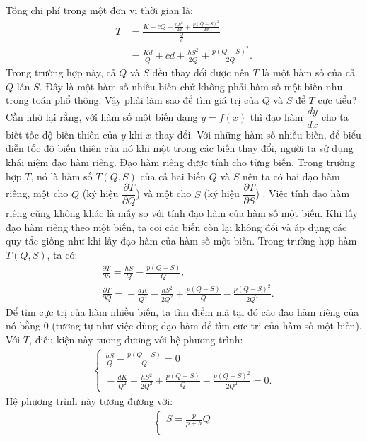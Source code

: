 \begin{multicols}{2}
	Tổng chi phí trong một đơn vị thời gian là:
	\begin{align*}
		T &= \frac{K + cQ + \frac{hS^2}{2d} + \frac{p(Q-S)^2}{2d}}{\frac{Q}{d}}\\
		 &= \frac{Kd}{Q} + cd + \frac{hS^2}{2Q} + \frac{p(Q-S)^2}{2Q}.
	\end{align*}
	Trong trường hợp này, cả $Q$ và $S$ đều thay đổi được nên $T$ là một hàm số của cả $Q$ lẫn $S$. Đây là một hàm số nhiều biến chứ không phải hàm số một biến như trong toán phổ thông. Vậy phải làm sao để tìm giá trị của $Q$ và $S$ để $T$ cực tiểu?
	\vskip 0.1cm
	Cần nhớ lại rằng, với hàm số một biến dạng $y=f(x)$ thì đạo hàm $\dfrac{dy}{dx}$ cho ta biết tốc độ biến thiên của $y$ khi $x$ thay đổi. Với những hàm số nhiều biến, để biểu diễn tốc độ biến thiên của nó khi một trong các biến thay đổi, người ta sử dụng khái niệm đạo hàm riêng. Đạo hàm riêng được tính cho từng biến. Trong trường hợp $T$, nó là hàm số $T(Q,S)$ của cả hai biến $Q$ và $S$ nên ta có hai đạo hàm riêng, một cho $Q$ (ký hiệu $\dfrac{\partial T}{\partial Q}$) và một cho $S$ (ký hiệu $\dfrac{\partial T}{\partial S}$) . Việc tính đạo hàm riêng cũng không khác là mấy so với tính đạo hàm của hàm số một biến. Khi lấy đạo hàm riêng theo một biến, ta coi các biến còn lại không đổi và áp dụng các quy tắc giống như khi lấy đạo hàm của hàm số một biến.
	\vskip 0.1cm
	Trong trường hợp hàm $T(Q,S)$, ta có:
	\begin{align*}
		&\frac{\partial T}{\partial S} = \frac{hS}{Q} - \frac{p(Q-S)}{Q},\\
		&\frac{\partial T}{\partial Q} = \!- \frac{dK}{Q^2} \!-\! \frac{hS^2}{2Q^2} \!+\! \frac{p(Q\!-\!S)}{Q} \!-\! \frac{p(Q\!-\!S)^2}{2Q^2}.
	\end{align*}
	Để tìm cực trị của hàm nhiều biến, ta tìm điểm mà tại đó các đạo hàm riêng của nó bằng $0$ (tương tự như việc dùng đạo hàm để tìm cực trị của hàm số một biến). Với $T$, điều kiện này tương đương với hệ phương trình:
	\begin{align*}
		\begin{cases}
			\frac{hS}{Q} - \frac{p(Q-S)}{Q}= 0\\
			\!-\!\frac{dK}{Q^2} \!-\! \frac{hS^2}{2Q^2} \!+\! \frac{p(Q\!-\!S)}{Q} \!-\! \frac{p(Q\!-\!S)^2}{2Q^2}\!=\! 0.
		\end{cases}
	\end{align*}
	Hệ phương trình này tương đương với:
	\begin{align*}
		\begin{cases}
			S = \frac{p}{p+h}Q\\

\end{cases}
\end{align*}
\end{multicols}
